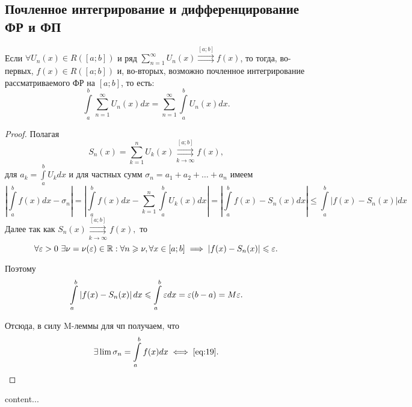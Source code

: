 \documentclass[../../main.tex]{subfiles}
\begin{document}
\subsection{Почленное интегрирование и дифференцирование ФР и ФП}

\begin{thm}
	Если $\forall U_n(x) \in R([a; b])$  и ряд $\sum\limits_{n = 1}^{\infty} U_n(x) \overset{[a; b]}{\rightrightarrows} f(x)$, то тогда, во-первых, $f(x) \in R([a; b])$ и, во-вторых, возможно почленное интегрирование рассматриваемого ФР на $[a; b]$, то есть:
	\begin{equation} \label{eq:19}
	\int\limits_{a}^{b} \sum\limits_{n = 1}^{\infty}  U_n(x) dx = \sum\limits_{n = 1}^{\infty}  \int\limits_{a}^{b} U_n(x) dx.
	\end{equation}
	
\end{thm}

\begin{proof}
	Полагая \[
	S_n(x) = \sum\limits_{k = 1}^{n} U_k(x) \overset{[a; b]}{\underset{k \to \infty}\rightrightarrows} f(x),
	\]
	для
	$
	a_k = \int \limits_{a}^{b}U_k dx 
	$ 
	и для частных сумм 
	$
	\sigma_n = a_1 + a_2 + \ldots + a_n
	$
	имеем
	\[
		\left| \int \limits_{a}^{b} f(x) dx - \sigma_n \right| = 
		\left| \int \limits_{a}^{b} f(x) dx - 
		\sum\limits_{k = 1}^{n} \int \limits_{a}^{b} U_k(x) dx \right| =
		\left| \int \limits_{a}^{b} f(x) - 
		S_n(x) dx \right| \le
		\int \limits_{a}^{b} \left| f(x) - 
		S_n(x)  \right|	dx
	\]
	Далее так как $S_n(x)\overset{[a; b]}{\underset{k \to \infty}\rightrightarrows} f(x),$ то 
	\[
	\forall \varepsilon > 0 \ \exists \nu = \nu(\varepsilon) \in \mathbb{R} : \forall n \geqslant \nu, \forall x \in [a; b] \implies 
	|f(x) - S_n(x)| \leqslant \varepsilon.
	\]
	
	Поэтому
	\[
		\int \limits_{a}^{b} \left| f(x) - S_n(x)  \right|	dx \leqslant \int \limits_{a}^{b} \varepsilon dx =
		\varepsilon(b - a) = M\varepsilon.
	\]
	
	Отсюда, в силу M-леммы для чп получаем, что
	\[
		\exists \lim \sigma_n = \int \limits_{a}^{b} f(x)dx \iff \eqref{eq:19}.
	\]
\end{proof}

\begin{crl}
	content...
\end{crl}
\end{document}
